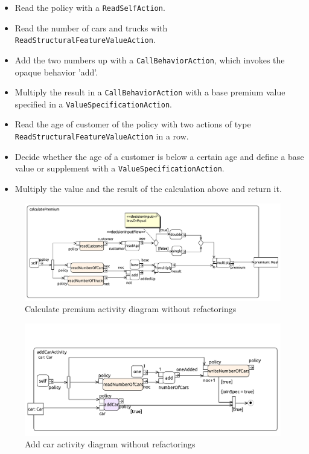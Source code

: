 \documentclass{llncs}
\begin{document}
\begin{itemize}
 \item Read the policy with a \texttt{Read\-Self\-Action}.
 \item Read the number of cars and trucks with \texttt{Read\-Structural\-Feature\-Value\-Action}.
 \item Add the two numbers up with a \texttt{Call\-Behavior\-Action}, which invokes the opaque behavior 'add'.
 \item Multiply the result in a \texttt{Call\-Behavior\-Action} with a base premium value specified in a \texttt{Value\-Specification\-Action}.
 \item Read the age of customer of the policy with two actions of type \texttt{Read\-Structural\-Feature\-Value\-Action} in a row.
 \item Decide whether the age of a customer is below a certain age and define a base value or supplement with a \texttt{Value\-Specification\-Action}.
 \item Multiply the value and the result of the calculation above and return it.
\end{itemize}

\begin{figure}[h!t]
 \centering
 \includegraphics[scale=0.5]{images/insurance/Activity_calculatePremium_calculatePremium}
 \caption{Calculate premium activity diagram without refactorings}
 \label{fig:calculatePremium}
\end{figure}

\begin{figure}[ht]
 \centering
 \includegraphics[scale=0.6]{images/insurance/Activity_addCarActivity_addCarActivity}
 \caption{Add car activity diagram without refactorings}
 \label{fig:addCar}
\end{figure}
\end{document}
